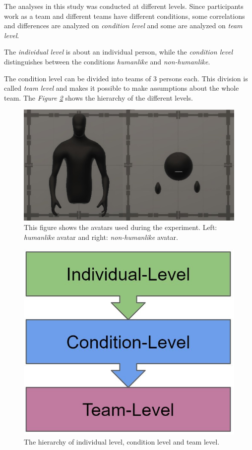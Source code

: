 \documentclass[sigchi]{acmart}
\begin{document}
The analyses in this study was conducted at different levels.
Since participants work as a team and different teams have different conditions, some correlations and differences are analyzed on \textit{condition level} and some are analyzed on \textit{team level}.

The \textit{individual level} is about an individual person, while the \textit{condition level} distinguishes between the conditions \textit{humanlike} and \textit{non-humanlike}.

The condition level can be divided into teams of 3 persons each. This division is called \textit{team level} and makes it possible to make assumptions about the whole team. 
The \textit{Figure \ref{DifferentLevels}} shows the hierarchy of the different levels.

\begin{figure}[h]
  \centering
 		\includegraphics[width=0.60\linewidth]{Abbildungen/Avatars.JPG}
			\caption[The avatars]{This figure shows the avatars used during the experiment. Left: \textit{humanlike} avatar and right: \textit{non-humanlike} avatar.}
			\label{Avatars}
\end{figure}	

\begin{figure}[h]
  \centering
 		\includegraphics[width=0.5\linewidth]{Abbildungen/DifferentLevels.JPG}	
			\caption[The hierarchy levels]{The hierarchy of individual level, condition level and team level.}
			\label{DifferentLevels}
\end{figure}	
	
\end{document}
